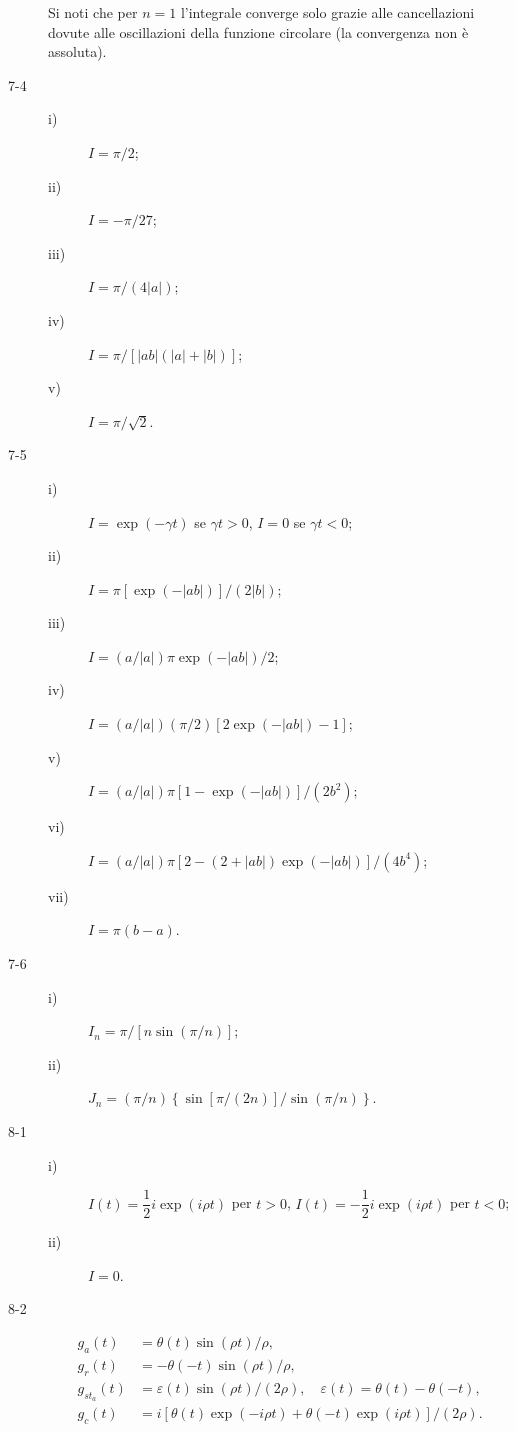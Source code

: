 \documentclass[11pt, a4paper]{book}
\numberwithin{equation}{section}
\begin{document}
\begin{description}
Si noti che per $n=1$ l'integrale converge solo grazie alle cancellazioni dovute alle oscillazioni della funzione circolare (la convergenza non è assoluta).

\item[7-4] 
\begin{description}
\item[i)] $I = \pi/2$;
\item[ii)] $I = -\pi/27$;
\item[iii)] $I = \pi/(4|a|)$;
\item[iv)] $I = \pi/\left[|ab|(|a|+|b|)\right]$;
\item[v)] $I = \pi/\sqrt{2}$.
\end{description}

\item[7-5] 
\begin{description}
\item[i)] $I = \exp(-\gamma t)$ \quad se $\gamma t > 0$, \quad $I = 0$ \quad se $\gamma t < 0$;
\item[ii)] $I = \pi\left[\exp(-|ab|)\right]/(2|b|)$;
\item[iii)] $I = (a/|a|)\pi\exp(-|ab|)/2$;
\item[iv)] $I = (a/|a|)(\pi/2)\left[2\exp(-|ab|) - 1\right]$;
\item[v)] $I = (a/|a|)\pi\left[1 - \exp(-|ab|)\right]/(2b^2)$;
\item[vi)] $I = (a/|a|)\pi\left[2 - (2+|ab|)\exp(-|ab|)\right]/(4b^4)$;
\item[vii)] $I = \pi(b-a)$.
\end{description}

\item[7-6] 
\begin{description}
\item[i)] $I_n = \pi/\left[n\sin(\pi/n)\right]$;
\item[ii)] $J_n = (\pi/n)\left\{\sin\left[\pi/(2n)\right]/\sin(\pi/n)\right\}$.
\end{description}

\item[8-1] 
\begin{description}
\item[i)] $I(t) = \dfrac{1}{2}i\exp(i\rho t)$ \quad per $t > 0$, \quad $I(t) = -\dfrac{1}{2}i\exp(i\rho t)$ \quad per $t < 0$;
\item[ii)] $I = 0$.
\end{description}

\item[8-2] 
\begin{align*}
g_a(t) &= \theta(t)\sin(\rho t)/\rho, \\
g_r(t) &= -\theta(-t)\sin(\rho t)/\rho, \\
g_{st_a}(t) &= \varepsilon(t)\sin(\rho t)/(2\rho), \quad \varepsilon(t) = \theta(t) - \theta(-t), \\
g_c(t) &= i\left[\theta(t)\exp(-i\rho t) + \theta(-t)\exp(i\rho t)\right]/(2\rho).
\end{align*}


\end{description}
\end{document}
